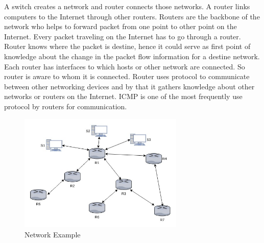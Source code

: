 \documentclass[12pt,oneside,a4paper]{article}
\begin{document}
A switch creates a network and router connects those networks. A router links computers to the Internet through other routers. Routers are the backbone of the network who helps to forward packet from one point to other point on the Internet. Every packet traveling on the Internet has to go through a router\cite{router-switch}. Router knows where the packet is destine, hence it could serve as first point of knowledge about the change in the packet flow information for a destine network. Each router has interfaces to which hosts or other network are connected. So router is aware to whom it is connected. Router uses protocol to communicate between other networking devices and by that it gathers knowledge about other networks or routers on the Internet. ICMP\cite{icmp} is one of the most frequently use protocol by routers for communication.\par

\begin{figure}[H]
\centering
\includegraphics[width=0.70\textwidth]{routers.jpg}
\caption{Network Example} \label{fig:routers}
\end{figure}
\end{document}
